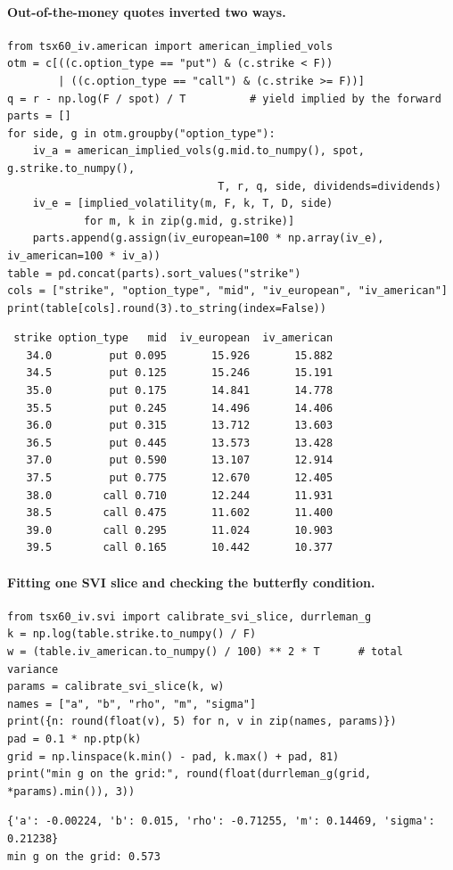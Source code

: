 \paragraph{Out-of-the-money quotes inverted two ways.}
{\footnotesize
\begin{verbatim}
from tsx60_iv.american import american_implied_vols
otm = c[((c.option_type == "put") & (c.strike < F))
        | ((c.option_type == "call") & (c.strike >= F))]
q = r - np.log(F / spot) / T          # yield implied by the forward
parts = []
for side, g in otm.groupby("option_type"):
    iv_a = american_implied_vols(g.mid.to_numpy(), spot, g.strike.to_numpy(),
                                 T, r, q, side, dividends=dividends)
    iv_e = [implied_volatility(m, F, k, T, D, side)
            for m, k in zip(g.mid, g.strike)]
    parts.append(g.assign(iv_european=100 * np.array(iv_e), iv_american=100 * iv_a))
table = pd.concat(parts).sort_values("strike")
cols = ["strike", "option_type", "mid", "iv_european", "iv_american"]
print(table[cols].round(3).to_string(index=False))
\end{verbatim}
\vspace{-0.6em}
\begin{verbatim}
 strike option_type   mid  iv_european  iv_american
   34.0         put 0.095       15.926       15.882
   34.5         put 0.125       15.246       15.191
   35.0         put 0.175       14.841       14.778
   35.5         put 0.245       14.496       14.406
   36.0         put 0.315       13.712       13.603
   36.5         put 0.445       13.573       13.428
   37.0         put 0.590       13.107       12.914
   37.5         put 0.775       12.670       12.405
   38.0        call 0.710       12.244       11.931
   38.5        call 0.475       11.602       11.400
   39.0        call 0.295       11.024       10.903
   39.5        call 0.165       10.442       10.377
\end{verbatim}
}

\paragraph{Fitting one SVI slice and checking the butterfly condition.}
{\footnotesize
\begin{verbatim}
from tsx60_iv.svi import calibrate_svi_slice, durrleman_g
k = np.log(table.strike.to_numpy() / F)
w = (table.iv_american.to_numpy() / 100) ** 2 * T      # total variance
params = calibrate_svi_slice(k, w)
names = ["a", "b", "rho", "m", "sigma"]
print({n: round(float(v), 5) for n, v in zip(names, params)})
pad = 0.1 * np.ptp(k)
grid = np.linspace(k.min() - pad, k.max() + pad, 81)
print("min g on the grid:", round(float(durrleman_g(grid, *params).min()), 3))
\end{verbatim}
\vspace{-0.6em}
\begin{verbatim}
{'a': -0.00224, 'b': 0.015, 'rho': -0.71255, 'm': 0.14469, 'sigma': 0.21238}
min g on the grid: 0.573
\end{verbatim}
}

